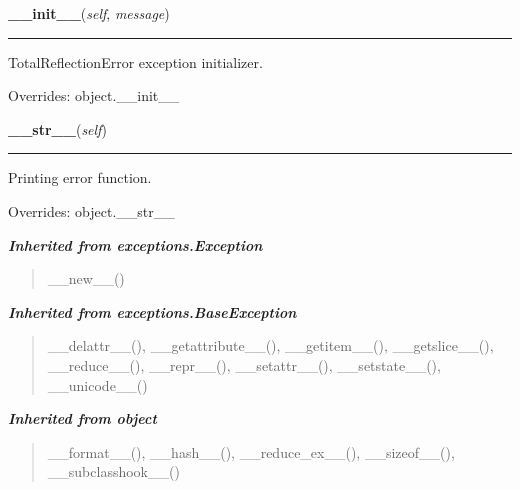 \hspace{.8\funcindent}\begin{boxedminipage}{\funcwidth}

    \raggedright \textbf{\_\_init\_\_}(\textit{self}, \textit{message})

    \vspace{-1.5ex}

    \rule{\textwidth}{0.5\fboxrule}
\setlength{\parskip}{2ex}
    TotalReflectionError exception initializer.

\setlength{\parskip}{1ex}
      Overrides: object.\_\_init\_\_

    \end{boxedminipage}

    \vspace{0.5ex}

\hspace{.8\funcindent}\begin{boxedminipage}{\funcwidth}

    \raggedright \textbf{\_\_str\_\_}(\textit{self})

    \vspace{-1.5ex}

    \rule{\textwidth}{0.5\fboxrule}
\setlength{\parskip}{2ex}
    Printing error function.

\setlength{\parskip}{1ex}
      Overrides: object.\_\_str\_\_

    \end{boxedminipage}


\large{\textbf{\textit{Inherited from exceptions.Exception}}}

\begin{quote}
\_\_new\_\_()
\end{quote}

\large{\textbf{\textit{Inherited from exceptions.BaseException}}}

\begin{quote}
\_\_delattr\_\_(), \_\_getattribute\_\_(), \_\_getitem\_\_(), \_\_getslice\_\_(), \_\_reduce\_\_(), \_\_repr\_\_(), \_\_setattr\_\_(), \_\_setstate\_\_(), \_\_unicode\_\_()
\end{quote}

\large{\textbf{\textit{Inherited from object}}}

\begin{quote}
\_\_format\_\_(), \_\_hash\_\_(), \_\_reduce\_ex\_\_(), \_\_sizeof\_\_(), \_\_subclasshook\_\_()
\end{quote}


